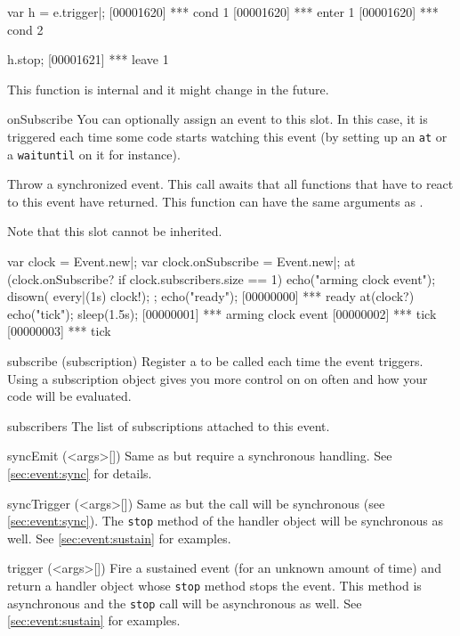 \begin{urbiscriptapi}
\begin{urbiscript}
var h = e.trigger|;
[00001620] *** cond 1
[00001620] *** enter 1
[00001620] *** cond 2

h.stop;
[00001621] *** leave 1
\end{urbiscript}

This function is internal and it might change in the future.


\item[onSubscribe]%
  You can optionally assign an event to this slot.
  In this case, it is triggered each time some code starts watching this
  event (by setting up an \lstinline|at| or a \lstinline|waituntil| on it
  for instance).

  Throw a synchronized event. This call awaits that all functions that have
  to react to this event have returned.  This function can have the same
  arguments as .

  Note that this slot cannot be inherited.

\begin{urbiscript}
var clock = Event.new|;
var clock.onSubscribe = Event.new|;
at (clock.onSubscribe? if clock.subscribers.size == 1)
{
  echo("arming clock event");
  disown({ every|(1s) clock!});
};
echo("ready");
[00000000] *** ready
at(clock?) echo("tick");
sleep(1.5s);
[00000001] *** arming clock event
[00000002] *** tick
[00000003] *** tick
\end{urbiscript}

\item[subscribe](subscription)%
  Register a  to be called each time the event triggers.
  Using a subscription object gives you more control on on often and how
  your code will be evaluated.

\item[subscribers]
  The list of subscriptions attached to this event.

\item[syncEmit](<args>[])%
  Same as  but require a synchronous handling.  See
  \autoref{sec:event:sync} for details.


\item[syncTrigger](<args>[])%
  Same as  but the call will be synchronous (see
  \autoref{sec:event:sync}). The \lstinline|stop| method of the handler
  object will be synchronous as well.  See \autoref{sec:event:sustain} for
  examples.


\item[trigger](<args>[])%
  Fire a sustained event (for an unknown amount of time) and return a
  handler object whose \lstinline|stop| method stops the event. This method
  is asynchronous and the \lstinline|stop| call will be asynchronous as
  well.  See \autoref{sec:event:sustain} for examples.
\end{urbiscriptapi}

